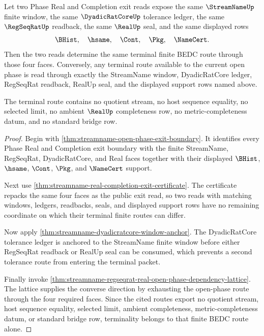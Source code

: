 \begin{theorem}
\label{thm:streamname-open-phase-four-face-terminality}
Let two Phase Real and Completion exit reads expose the same $\StreamNameUp$ finite window, the same $\DyadicRatCoreUp$ tolerance ledger, the same $\RegSeqRatUp$ readback, the same $\RealUp$ seal, and the same displayed rows
$$
\BHist,\quad \hsame,\quad \Cont,\quad \Pkg,\quad \NameCert.
$$
Then the two reads determine the same terminal finite BEDC route through those four faces. Conversely, any terminal route available to the current open phase is read through exactly the StreamName window, DyadicRatCore ledger, RegSeqRat readback, RealUp seal, and the displayed support rows named above.

The terminal route contains no quotient stream, no host sequence equality, no selected limit, no ambient $\RealUp$ completeness row, no metric-completeness datum, and no standard bridge row.
\end{theorem}
\begin{proof}
Begin with \autoref{thm:streamname-open-phase-exit-boundary}. It identifies every Phase Real and Completion exit boundary with the finite StreamName, RegSeqRat, DyadicRatCore, and Real faces together with their displayed $\BHist$, $\hsame$, $\Cont$, $\Pkg$, and $\NameCert$ support.

Next use \autoref{thm:streamname-real-completion-exit-certificate}. The certificate repacks the same four faces as the public exit read, so two reads with matching windows, ledgers, readbacks, seals, and displayed support rows have no remaining coordinate on which their terminal finite routes can differ.

Now apply \autoref{thm:streamname-dyadicratcore-window-anchor}. The DyadicRatCore tolerance ledger is anchored to the StreamName finite window before either RegSeqRat readback or RealUp seal can be consumed, which prevents a second tolerance route from entering the terminal packet.

Finally invoke \autoref{thm:streamname-regseqrat-real-open-phase-dependency-lattice}. The lattice supplies the converse direction by exhausting the open-phase route through the four required faces. Since the cited routes export no quotient stream, host sequence equality, selected limit, ambient completeness, metric-completeness datum, or standard bridge row, terminality belongs to that finite BEDC route alone.
\end{proof}

